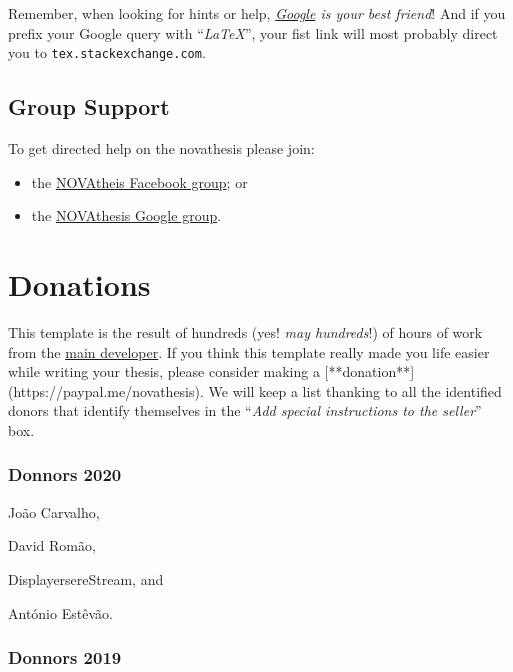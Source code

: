 Remember, when looking for hints or help, \emph{\href{google.com}{Google} is your best friend}!   And if you prefix your Google query with “\emph{LaTeX}”, your fist link will most probably direct you to \texttt{tex.stackexchange.com}.

\subsection{Group Support}
\label{sub:group_support}

To get directed help on the \acrlong{novathesis} please join:
\begin{itemize}
  \item the \href{https://www.facebook.com/groups/novathesis}{NOVAtheis Facebook group}; or
  \item the \href{https://groups.google.com/forum/#!forum/novathesis}{NOVAthesis Google group}.
\end{itemize}  


\section{Donations}
\label{sec:donations}

This template is the result of hundreds (yes! \emph{may hundreds}!) of hours of work from the \href{https://docentes.fct.unl.pt/joao-lourenco}{main developer}.  If you think this template really made you life easier while writing your thesis, please consider making a [**donation**](https://paypal.me/novathesis). We will keep a list thanking to all the identified donors that identify themselves in the “\emph{Add special instructions to the seller}” box.

\subsubsection*{Donnors 2020}
\label{ssub:donnors_2020}

\begin{inparaitem}[]
  \item João Carvalho, 
  \item David Romão, 
  \item DisplayersereStream, and
  \item António Estêvão.  
\end{inparaitem}

\subsubsection*{Donnors 2019}
\label{ssub:donnors_2019}

